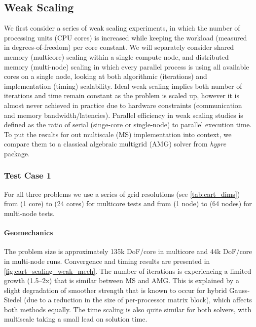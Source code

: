 \subsection{Weak Scaling}

We first consider a series of weak scaling experiments, in which the number of processing units (CPU cores) is increased while keeping the workload (measured in degrees-of-freedom) per core constant.   We will separately consider shared memory (multicore) scaling within a single compute node, and distributed memory (multi-node) scaling in which every parallel process is using all available cores on a single node, looking at both algorithmic (iterations) and implementation (timing) scalability.   Ideal weak scaling implies both number of iterations and time remain constant as the problem is scaled up, however it is almost never achieved in practice due to hardware constraints (communication and memory bandwidth/latencies).   Parallel efficiency in weak scaling studies is defined as the ratio of serial (singe-core or single-node) to parallel execution time.   To put the results for out multiscale (MS) implementation into context, we compare them to a classical algebraic multigrid (AMG) solver from \textit{hypre} package. 

\subsubsection{Test Case 1}

For all three problems we use a series of grid resolutions (see \cref{tab:cart_dims}) from  (1 core) to  (24 cores) for multicore tests and from  (1 node) to  (64 nodes) for multi-node tests.   

\paragraph{Geomechanics}
The problem size is approximately 135k DoF/core in multicore and 44k DoF/core in multi-node runs.   Convergence and timing results are presented in \cref{fig:cart_scaling_weak_mech}.   The number of iterations is experiencing a limited growth (1.5--2x) that is similar between MS and AMG.   This is explained by a slight degradation of smoother strength that is known to occur for hybrid Gauss-Siedel (due to a reduction in the size of per-processor matrix block), which affects both methods equally.   The time scaling is also quite similar for both solvers, with multiscale taking a small lead on solution time.

